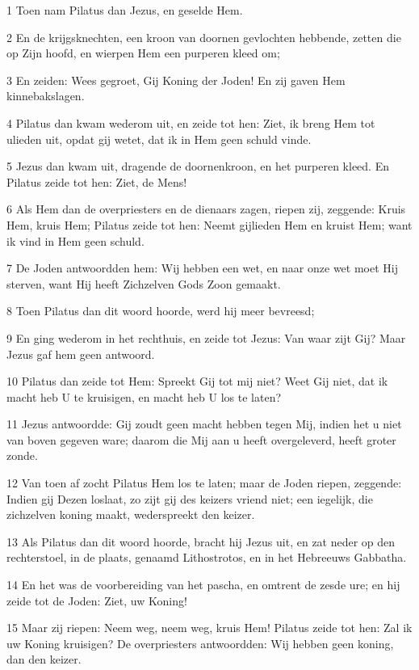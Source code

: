 \par 1 Toen nam Pilatus dan Jezus, en geselde Hem.
\par 2 En de krijgsknechten, een kroon van doornen gevlochten hebbende, zetten die op Zijn hoofd, en wierpen Hem een purperen kleed om;
\par 3 En zeiden: Wees gegroet, Gij Koning der Joden! En zij gaven Hem kinnebakslagen.
\par 4 Pilatus dan kwam wederom uit, en zeide tot hen: Ziet, ik breng Hem tot ulieden uit, opdat gij wetet, dat ik in Hem geen schuld vinde.
\par 5 Jezus dan kwam uit, dragende de doornenkroon, en het purperen kleed. En Pilatus zeide tot hen: Ziet, de Mens!
\par 6 Als Hem dan de overpriesters en de dienaars zagen, riepen zij, zeggende: Kruis Hem, kruis Hem; Pilatus zeide tot hen: Neemt gijlieden Hem en kruist Hem; want ik vind in Hem geen schuld.
\par 7 De Joden antwoordden hem: Wij hebben een wet, en naar onze wet moet Hij sterven, want Hij heeft Zichzelven Gods Zoon gemaakt.
\par 8 Toen Pilatus dan dit woord hoorde, werd hij meer bevreesd;
\par 9 En ging wederom in het rechthuis, en zeide tot Jezus: Van waar zijt Gij? Maar Jezus gaf hem geen antwoord.
\par 10 Pilatus dan zeide tot Hem: Spreekt Gij tot mij niet? Weet Gij niet, dat ik macht heb U te kruisigen, en macht heb U los te laten?
\par 11 Jezus antwoordde: Gij zoudt geen macht hebben tegen Mij, indien het u niet van boven gegeven ware; daarom die Mij aan u heeft overgeleverd, heeft groter zonde.
\par 12 Van toen af zocht Pilatus Hem los te laten; maar de Joden riepen, zeggende: Indien gij Dezen loslaat, zo zijt gij des keizers vriend niet; een iegelijk, die zichzelven koning maakt, wederspreekt den keizer.
\par 13 Als Pilatus dan dit woord hoorde, bracht hij Jezus uit, en zat neder op den rechterstoel, in de plaats, genaamd Lithostrotos, en in het Hebreeuws Gabbatha.
\par 14 En het was de voorbereiding van het pascha, en omtrent de zesde ure; en hij zeide tot de Joden: Ziet, uw Koning!
\par 15 Maar zij riepen: Neem weg, neem weg, kruis Hem! Pilatus zeide tot hen: Zal ik uw Koning kruisigen? De overpriesters antwoordden: Wij hebben geen koning, dan den keizer.
